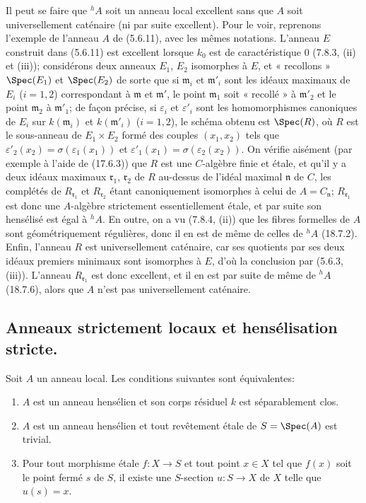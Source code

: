 \begin{remark}[18.7.7]
\label{IV.18.7.7}
Il peut se faire que ${}^h\!A$ soit un anneau local excellent sans que $A$ soit universellement caténaire (ni par suite excellent). Pour le voir, reprenons l'exemple de l'anneau $A$ de (5.6.11), avec les mêmes notations. L'anneau $E$ construit dans (5.6.11) est excellent lorsque $k_0$ est de caractéristique $0$ (7.8.3, (ii) et (iii)); considérons deux anneaux $E_1$, $E_2$ isomorphes à $E$, et « recollons » $\Spec(E_1)$ et $\Spec(E_2)$ de sorte que si $\mathfrak m_i$ et $\mathfrak m'_i$ sont les idéaux maximaux de $E_i$ ($i=1,2$) correspondant à $\mathfrak m$ et $\mathfrak m'$, le point $\mathfrak m_1$ soit « recollé » à $\mathfrak m'_2$ et le point $\mathfrak m_2$ à $\mathfrak m'_1$; de façon précise, si $\varepsilon_i$ et $\varepsilon'_i$ sont les homomorphismes canoniques de $E_i$ sur $k(\mathfrak m_i)$ et $k(\mathfrak m'_i)$ ($i=1,2$), le schéma obtenu est $\Spec(R)$, où $R$ est le sous-anneau de $E_1\times E_2$ formé des couples $(x_1,x_2)$ tels que $\varepsilon'_2(x_2)=\sigma(\varepsilon_1(x_1))$ et $\varepsilon'_1(x_1)=\sigma(\varepsilon_2(x_2))$. On vérifie aisément (par exemple à l'aide de (17.6.3)) que $R$ est une $C$-algèbre finie et étale, et qu'il y a deux idéaux maximaux $\mathfrak r_1$, $\mathfrak r_2$ de $R$ au-dessus de l'idéal maximal $\mathfrak n$ de $C$, les complétés de $R_{\mathfrak r_1}$ et $R_{\mathfrak r_2}$ étant canoniquement isomorphes à celui de $A=C_{\mathfrak n}$; $R_{\mathfrak r_1}$ est donc une $A$-algèbre strictement essentiellement étale, et par suite son hensélisé est égal à ${}^h\!A$. En outre, on a vu (7.8.4, (ii)) que les fibres formelles de $A$ sont géométriquement régulières, donc il en est de même de celles de ${}^h\!A$ (18.7.2). Enfin, l'anneau $R$ est universellement caténaire, car ses quotients par ses deux idéaux premiers minimaux sont isomorphes à $E$, d'où la conclusion par (5.6.3, (iii)). L'anneau $R_{\mathfrak r_1}$ est donc excellent, et il en est par suite de même de ${}^h\!A$ (18.7.6), alors que $A$ n'est pas universellement caténaire.
\end{remark}

\subsection{Anneaux strictement locaux et hensélisation stricte.}
\label{subsection:IV.18.8}

\begin{proposition}[18.8.1]
\label{IV.18.8.1}
Soit $A$ un anneau local. Les conditions suivantes sont équivalentes:
\begin{enumerate}
  \item[$a)$] $A$ est un anneau hensélien et son corps résiduel $k$ est séparablement clos.
  \item[$b)$] $A$ est un anneau hensélien et tout revêtement étale de $S=\Spec(A)$ est trivial.
  \item[$c)$] Pour tout morphisme étale $f:X\to S$ et tout point $x\in X$ tel que $f(x)$ soit le point fermé $s$ de $S$, il existe une $S$-section $u:S\to X$ de $X$ telle que $u(s)=x$.
\end{enumerate}
\end{proposition}

